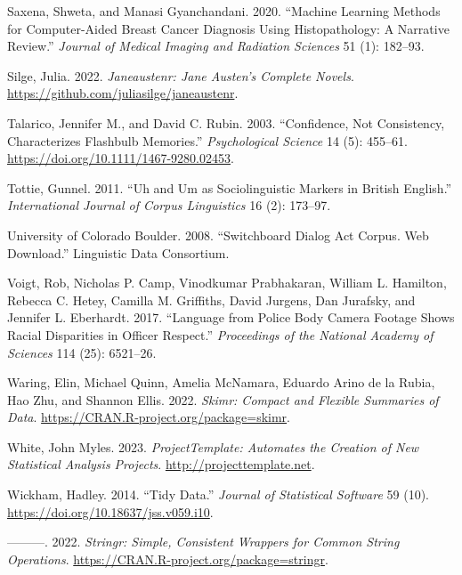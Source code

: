 \documentclass[
  letterpaper,
  DIV=11,
  numbers=noendperiod]{scrreport}
\newlength{\cslhangindent}
\newlength{\cslentryspacingunit} %
\newenvironment{CSLReferences}[2] %
 {%
  \setlength{\parindent}{0pt}
  \ifodd #1
  \let\oldpar\par
  \def\par{\hangindent=\cslhangindent\oldpar}
  \fi
  \setlength{\parskip}{#2\cslentryspacingunit}
 }%
 {}
\theoremstyle{definition}
\theoremstyle{remark}
\begin{document}
\begin{CSLReferences}{1}{0}
\leavevmode{}%
Saxena, Shweta, and Manasi Gyanchandani. 2020. {``Machine Learning
Methods for Computer-Aided Breast Cancer Diagnosis Using Histopathology:
A Narrative Review.''} \emph{Journal of Medical Imaging and Radiation
Sciences} 51 (1): 182--93.

\leavevmode{}%
Silge, Julia. 2022. \emph{Janeaustenr: Jane Austen's Complete Novels}.
\url{https://github.com/juliasilge/janeaustenr}.

\leavevmode{}%
Talarico, Jennifer M., and David C. Rubin. 2003. {``Confidence, Not
Consistency, Characterizes Flashbulb Memories.''} \emph{Psychological
Science} 14 (5): 455--61. \url{https://doi.org/10.1111/1467-9280.02453}.

\leavevmode{}%
Tottie, Gunnel. 2011. {``Uh and Um as Sociolinguistic Markers in British
English.''} \emph{International Journal of Corpus Linguistics} 16 (2):
173--97.

\leavevmode{}%
University of Colorado Boulder. 2008. {``Switchboard Dialog Act Corpus.
Web Download.''} Linguistic Data Consortium.

\leavevmode{}%
Voigt, Rob, Nicholas P. Camp, Vinodkumar Prabhakaran, William L.
Hamilton, Rebecca C. Hetey, Camilla M. Griffiths, David Jurgens, Dan
Jurafsky, and Jennifer L. Eberhardt. 2017. {``Language from Police Body
Camera Footage Shows Racial Disparities in Officer Respect.''}
\emph{Proceedings of the National Academy of Sciences} 114 (25):
6521--26.

\leavevmode{}%
Waring, Elin, Michael Quinn, Amelia McNamara, Eduardo Arino de la Rubia,
Hao Zhu, and Shannon Ellis. 2022. \emph{Skimr: Compact and Flexible
Summaries of Data}. \url{https://CRAN.R-project.org/package=skimr}.

\leavevmode{}%
White, John Myles. 2023. \emph{ProjectTemplate: Automates the Creation
of New Statistical Analysis Projects}. \url{http://projecttemplate.net}.

\leavevmode{}%
Wickham, Hadley. 2014. {``Tidy Data.''} \emph{Journal of Statistical
Software} 59 (10). \url{https://doi.org/10.18637/jss.v059.i10}.

\leavevmode{}%
---------. 2022. \emph{Stringr: Simple, Consistent Wrappers for Common
String Operations}. \url{https://CRAN.R-project.org/package=stringr}.


\end{CSLReferences}
\end{document}
